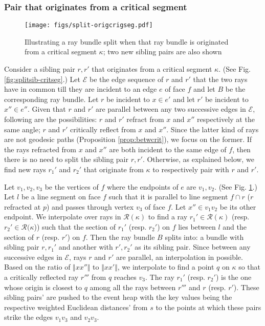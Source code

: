 \documentclass[11pt]{article}
\def\calE{\mathcal{E}}
\def\calR{\mathcal{R}}
\begin{document}
\subsubsection{Pair that originates from a critical segment}
\label{subsubsect:splitcritseg}

\begin{figure}[h]
\begin{minipage}[t]{\linewidth}
\begin{center}
\texttt{[image: figs/split-origcrigseg.pdf]}
\caption{\footnotesize Illustrating a ray bundle split when that ray bundle is originated from a critical segment $\kappa$; two new sibling pairs are also shown}
\label{fig:split-origcrigseg}
\end{center}
\end{minipage}
\vspace*{-0.2in}
\end{figure}

Consider a sibling pair $r, r'$ that originates from a critical segment $\kappa$. 
(See Fig. \ref{fig:splitsib-critseg}.)
Let $\calE$ be the edge sequence of $r$ and $r'$ that the two rays have in common till they are incident to an edge $e$ of face $f$ and let $B$ be the corresponding ray bundle.
Let $r$ be incident to $x \in e'$ and let $r'$ be incident to $x'' \in e''$.
Given that $r$ and $r'$ are parallel between any two successive edges in $\calE$, following are the possibilities:
$r$ and $r'$ refract from $x$ and $x''$ respectively at the same angle;
$r$ and $r'$ critically reflect from $x$ and $x''$.
Since the latter kind of rays are not geodesic paths (Proposition \ref{prop:betwcrit}), we focus on the former.
If the rays refracted from $x$ and $x''$ are both incident to the same edge of $f$, then there is no need to split the sibling pair $r, r'$.
Otherwise, as explained below, we find new rays $r_1'$ and $r_2'$ that originate from $\kappa$ to respectively pair with $r$ and $r'$.

Let $v_1, v_2, v_3$ be the vertices of $f$ where the endpoints of $e$ are $v_1, v_2$. 
(See Fig. \ref{fig:split-origcrigseg}.)
Let $l$ be a line segment on face $f$ such that it is parallel to line segment $f \cap r$ ($r$ refracted at $p$) and passes through vertex $v_3$ of face $f$. 
Let $x'' \in v_1v_2$ be its other endpoint.
We interpolate over rays in $\calR(\kappa)$ to find a ray $r_1' \in \calR(\kappa)$ (resp. $r_2' \in \calR(\kappa$)) such that the section of $r_1'$ (resp. $r_2'$) on $f$ lies between $l$ and the section of $r$ (resp. $r'$) on $f$.
Then the ray bundle $B$ splits into: a bundle with sibling pair $r, r_1'$ and another with $r', r_2'$ as its sibling pair.
Since between any successive edges in $\calE$, rays $r$ and $r'$ are parallel, an interpolation in possible.
Based on the ratio of $\Vert xx'' \Vert$ to $\Vert xx' \Vert$, we interpolate to find a point $q$ on $\kappa$ so that a critically reflected ray $r'''$ from $q$ reaches $v_3$.
The ray $r_1'$ (resp. $r_2'$) is the one whose origin is closest to $q$ among all the rays between $r'''$ and $r$ (resp. $r'$).
These sibling pairs' are pushed to the event heap with the key values being the respective weighted Euclidean distances' from $s$ to the points at which these pairs strike the edges $v_1v_3$ and $v_2v_3$. 
\end{document}
